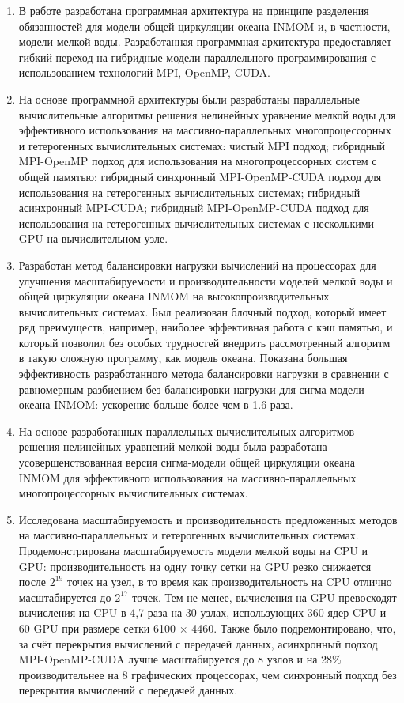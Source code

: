 \begin{enumerate}
\item В работе разработана программная архитектура на принципе разделения обязанностей для модели общей циркуляции океана INMOM и, в частности,  модели мелкой воды. Разработанная программная архитектура предоставляет гибкий переход на гибридные модели параллельного программирования с использованием технологий MPI, OpenMP, CUDA.
\item На основе программной архитектуры были разработаны параллельные вычислительные алгоритмы решения нелинейных уравнение мелкой воды для эффективного использования на массивно-параллельных многопроцессорных и гетерогенных вычислительных системах:
чистый MPI подход;
гибридный MPI-OpenMP подход для использования на многопроцессорных систем с общей памя­тью;
гибридный синхронный MPI-OpenMP-CUDA подход для использования на гетерогенных вычислительных системах;
гибридный асинхронный MPI-CUDA;
гибридный MPI-OpenMP-CUDA подход для использования на гетерогенных вычислительных системах с несколькими GPU на вычислительном узле.
\item Разработан метод балансировки нагрузки вычислений на процессорах для улучшения масштабируемости и производительности моделей мелкой воды и общей циркуляции океана INMOM на высокопроизводительных вычислительных системах. Был реализован блочный подход, который имеет ряд преимуществ, например, наиболее эффективная работа с кэш памятью, и который позволил без особых трудностей внедрить рассмотренный алгоритм в такую сложную программу, как модель океана. Показана большая эффективность разработанного метода балансировки нагрузки в сравнении с равномерным разбиением без балансировки нагрузки для сигма-модели океана INMOM: ускорение больше более чем в 1.6 раза.
\item На основе разработанных параллельных вычислительных алгоритмов решения нелинейных уравнений мелкой воды была разработана усовершенствованная версия сигма-модели общей циркуляции океана INMOM для эффективного использования на массивно-параллельных многопроцессорных вычислительных системах.
\item Исследована масштабируемость и производительность предложенных методов на массивно-параллельных и гетерогенных вычислительных системах. Продемонстрирована масштабируемость модели мелкой воды на CPU и GPU: производительность на одну точку сетки на GPU резко снижается после $2^{19}$ точек на узел, в то время как производительность на CPU отлично масштабируется до $2^{17}$ точек. Тем не менее, вычисления на GPU превосходят вычисления на CPU в 4,7 раза на 30 узлах, использующих 360 ядер CPU и 60 GPU при размере сетки 6100 $\times$ 4460. Также было подремонтировано, что, за счёт перекрытия вычислений с передачей данных, асинхронный подход MPI-OpenMP-CUDA лучше масштабируется до 8 узлов и на 28\% производительнее на 8 графических процессорах, чем синхронный подход без перекрытия вычислений с передачей данных.
\end{enumerate}
